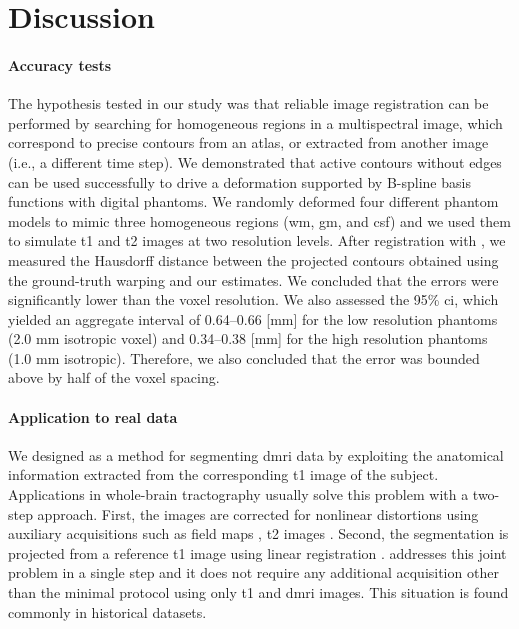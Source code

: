 \section{Discussion}
\label{sec:discussion}

\paragraph*{Accuracy tests}
The hypothesis tested in our study was that reliable image registration can be performed
  by searching for homogeneous regions in a multispectral image, which correspond to precise contours
  from an atlas, or extracted from another image (i.e., a different time step).
We demonstrated that active contours without edges can be used successfully to drive a
  deformation supported by B-spline basis functions with digital phantoms.
We randomly deformed four different phantom models to mimic three homogeneous regions
  (\gls*{wm}, \gls*{gm}, and \acrlong*{csf}) and we used them to simulate \gls*{t1} and \gls*{t2}
  images at two resolution levels.
After registration with \regseg{}, we measured the Hausdorff distance between the
  projected contours obtained using the ground-truth warping and our estimates.
We concluded that the errors were significantly lower than the voxel resolution.
We also assessed the 95\% \gls*{ci}, which yielded an aggregate interval of
  0.64--0.66 [mm] for the low resolution phantoms (2.0 mm isotropic voxel) and
  0.34--0.38 [mm] for the high resolution phantoms (1.0 mm isotropic).
Therefore, we also concluded that the error was bounded above by half of the
  voxel spacing.

\paragraph*{Application to real data}
We designed \regseg{} as a method for segmenting \gls*{dmri} data by exploiting the
  anatomical information extracted from the corresponding \gls*{t1} image of the subject.
Applications in whole-brain tractography \citep{smith_tractbased_2006,craddock_imaging_2013}
  usually solve this problem with a two-step approach.
First, the images are corrected for nonlinear distortions using auxiliary acquisitions
  such as field maps \citep{jezzard_correction_1995}, \gls*{t2} images \citep{kybic_unwarping_2000}.
Second, the segmentation is projected from a reference \gls*{t1} image using linear
  registration \citep{greve_accurate_2009}.
\Regseg{} addresses this joint problem in a single step and it does not require any additional
  acquisition other than the minimal protocol using only \gls*{t1} and \gls*{dmri} images.
This situation is found commonly in historical datasets.

